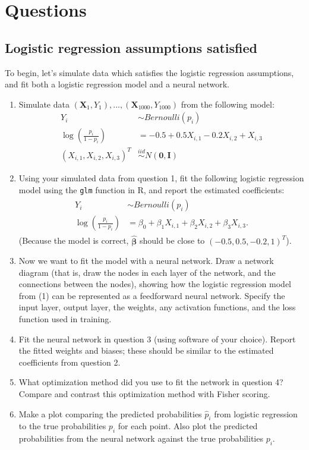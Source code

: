 \documentclass[11pt]{article}
\begin{document}
\section*{Questions}

\subsection*{Logistic regression assumptions satisfied}

To begin, let's simulate data which satisfies the logistic regression assumptions, and fit both a logistic regression model and a neural network.

\begin{enumerate}
\item Simulate data $(\bm{X}_1, Y_1),...,(\bm{X}_{1000}, Y_{1000})$ from the following model:
\begin{align*}
Y_i &\sim Bernoulli(p_i) \\
\log \left( \frac{p_i}{1 - p_i} \right) &= -0.5 + 0.5 X_{i,1} - 0.2 X_{i,2} + X_{i,3} \\
(X_{i,1}, X_{i,2}, X_{i,3})^T &\overset{iid}{\sim} N(\bm{0}, \bm{I})
\end{align*}

\item Using your simulated data from question 1, fit the following logistic regression model using the \verb;glm; function in R, and report the estimated coefficients:
\begin{align}
\begin{split}
Y_i &\sim Bernoulli(p_i) \\
\log \left( \frac{p_i}{1 - p_i} \right) &= \beta_0 + \beta_1 X_{i,1} + \beta_2 X_{i,2} + \beta_3 X_{i,3}.
\end{split}
\end{align}
(Because the model is correct, $\widehat{\bm{\beta}}$ should be close to $(-0.5, 0.5, -0.2, 1)^T$).

\item Now we want to fit the model with a neural network. Draw a network diagram (that is, draw the nodes in each layer of the network, and the connections between the nodes), showing how the logistic regression model from (1) can be represented as a feedforward neural network. Specify the input layer, output layer, the weights, any activation functions, and the loss function used in training.

\item Fit the neural network in question 3 (using software of your choice). Report the fitted weights and biases; these should be similar to the estimated coefficients from question 2.

\item What optimization method did you use to fit the network in question 4? Compare and contrast this optimization method with Fisher scoring.

\item Make a plot comparing the predicted probabilities $\widehat{p}_i$ from logistic regression to the true probabilities $p_i$ for each point. Also plot the predicted probabilities from the neural network against the true probabilities $p_i$.
\end{enumerate}
\end{document}
